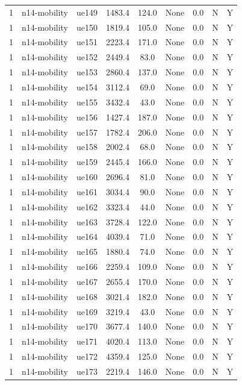 \begin{table}[ht]
\begin{tabular}{|c|c|c|c|c|c|c|c|c|}
1 & n14-mobility & ue149 & 1483.4 & 124.0 & None & 0.0 & N & Y \\
1 & n14-mobility & ue150 & 1819.4 & 105.0 & None & 0.0 & N & Y \\
1 & n14-mobility & ue151 & 2223.4 & 171.0 & None & 0.0 & N & Y \\
1 & n14-mobility & ue152 & 2449.4 & 83.0 & None & 0.0 & N & Y \\
1 & n14-mobility & ue153 & 2860.4 & 137.0 & None & 0.0 & N & Y \\
1 & n14-mobility & ue154 & 3112.4 & 69.0 & None & 0.0 & N & Y \\
1 & n14-mobility & ue155 & 3432.4 & 43.0 & None & 0.0 & N & Y \\
1 & n14-mobility & ue156 & 1427.4 & 187.0 & None & 0.0 & N & Y \\
1 & n14-mobility & ue157 & 1782.4 & 206.0 & None & 0.0 & N & Y \\
1 & n14-mobility & ue158 & 2002.4 & 68.0 & None & 0.0 & N & Y \\
1 & n14-mobility & ue159 & 2445.4 & 166.0 & None & 0.0 & N & Y \\
1 & n14-mobility & ue160 & 2696.4 & 81.0 & None & 0.0 & N & Y \\
1 & n14-mobility & ue161 & 3034.4 & 90.0 & None & 0.0 & N & Y \\
1 & n14-mobility & ue162 & 3323.4 & 44.0 & None & 0.0 & N & Y \\
1 & n14-mobility & ue163 & 3728.4 & 122.0 & None & 0.0 & N & Y \\
1 & n14-mobility & ue164 & 4039.4 & 71.0 & None & 0.0 & N & Y \\
1 & n14-mobility & ue165 & 1880.4 & 74.0 & None & 0.0 & N & Y \\
1 & n14-mobility & ue166 & 2259.4 & 109.0 & None & 0.0 & N & Y \\
1 & n14-mobility & ue167 & 2655.4 & 170.0 & None & 0.0 & N & Y \\
1 & n14-mobility & ue168 & 3021.4 & 182.0 & None & 0.0 & N & Y \\
1 & n14-mobility & ue169 & 3219.4 & 43.0 & None & 0.0 & N & Y \\
1 & n14-mobility & ue170 & 3677.4 & 140.0 & None & 0.0 & N & Y \\
1 & n14-mobility & ue171 & 4020.4 & 113.0 & None & 0.0 & N & Y \\
1 & n14-mobility & ue172 & 4359.4 & 125.0 & None & 0.0 & N & Y \\
1 & n14-mobility & ue173 & 2219.4 & 146.0 & None & 0.0 & N & Y \\

\end{tabular}
\end{table}
